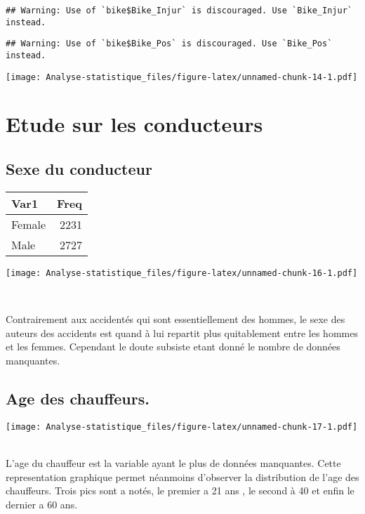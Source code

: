 \documentclass[
  french,
]{article}
\begin{document}
\begin{verbatim}
## Warning: Use of `bike$Bike_Injur` is discouraged. Use `Bike_Injur` instead.
\end{verbatim}

\begin{verbatim}
## Warning: Use of `bike$Bike_Pos` is discouraged. Use `Bike_Pos` instead.
\end{verbatim}

\texttt{[image: Analyse-statistique\_files/figure-latex/unnamed-chunk-14-1.pdf]}

\hypertarget{etude-sur-les-conducteurs}{%
\section{Etude sur les conducteurs}\label{etude-sur-les-conducteurs}}

\hypertarget{sexe-du-conducteur}{%
\subsection{Sexe du conducteur}\label{sexe-du-conducteur}}

\begin{table}
\centering
\begin{tabular}{l|r}
\hline
Var1 & Freq\\
\hline
Female & 2231\\
\hline
Male & 2727\\
\hline
\end{tabular}
\end{table}

\texttt{[image: Analyse-statistique\_files/figure-latex/unnamed-chunk-16-1.pdf]}

~

Contrairement aux accidentés qui sont essentiellement des hommes, le
sexe des auteurs des accidents est quand à lui repartit plus
quitablement entre les hommes et les femmes. Cependant le doute subsiste
etant donné le nombre de données manquantes.

\hypertarget{age-des-chauffeurs.}{%
\subsection{Age des chauffeurs.}\label{age-des-chauffeurs.}}

\texttt{[image: Analyse-statistique\_files/figure-latex/unnamed-chunk-17-1.pdf]}
~

L'age du chauffeur est la variable ayant le plus de données manquantes.
Cette representation graphique permet néanmoins d'observer la
distribution de l'age des chauffeurs. Trois pics sont a notés, le
premier a 21 ans , le second à 40 et enfin le dernier a 60 ans.
\end{document}
